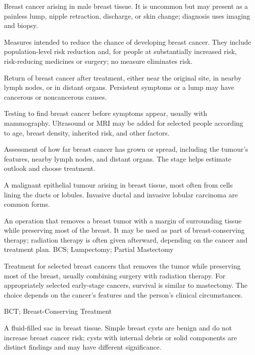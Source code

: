  Breast cancer arising in male breast tissue. It is uncommon but may present as a painless lump, nipple retraction, discharge, or skin change; diagnosis uses imaging and biopsy.

 Measures intended to reduce the chance of developing breast cancer. They include population-level risk reduction and, for people at substantially increased risk, risk-reducing medicines or surgery; no measure eliminates risk.

 Return of breast cancer after treatment, either near the original site, in nearby lymph nodes, or in distant organs. Persistent symptoms or a lump may have cancerous or noncancerous causes.

 Testing to find breast cancer before symptoms appear, usually with mammography. Ultrasound or MRI may be added for selected people according to age, breast density, inherited risk, and other factors.

 Assessment of how far breast cancer has grown or spread, including the tumour's features, nearby lymph nodes, and distant organs. The stage helps estimate outlook and choose treatment.

 A malignant epithelial tumour arising in breast
tissue, most often from cells lining the ducts or lobules. Invasive ductal and
invasive lobular carcinoma are common forms.

 An operation that removes a breast tumor with a margin of surrounding tissue while preserving
most of the breast.
It may be used as part of breast-conserving therapy; radiation therapy
is often given afterward, depending on the cancer and treatment plan.
\synonyms
BCS; Lumpectomy; Partial Mastectomy

 Treatment for selected breast cancers that removes the tumor while preserving most of the breast,
usually combining surgery with radiation therapy. For appropriately selected
early-stage cancers, survival is similar to mastectomy. The choice depends
on the cancer's features and the person's clinical circumstances.

\synonyms
BCT; Breast-Conserving Treatment

 A fluid-filled sac in breast tissue. Simple breast cysts are benign and do not increase breast cancer risk; cysts with internal debris or solid components are distinct findings and may have different significance.


